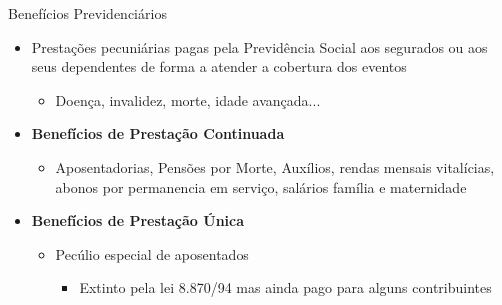 \begin{frame}
  \begin{block}{Benefícios Previdenciários}
    \begin{itemize}
      \item Prestações pecuniárias pagas pela Previdência Social aos segurados
      ou aos seus dependentes de forma a atender a cobertura dos
      \alert{eventos}
      \begin{itemize}
        \item Doença, invalidez, morte, idade avançada...
      \end{itemize}
      \item \textbf{Benefícios de Prestação Continuada}
      \begin{itemize}
        \item Aposentadorias, Pensões por Morte, Auxílios, rendas mensais
        vitalícias, abonos por permanencia em serviço, salários família e
        maternidade
      \end{itemize}
      \item \textbf{Benefícios de Prestação Única}
      \begin{itemize}
        \item Pecúlio especial de aposentados
        \begin{itemize}
          \item Extinto pela lei 8.870/94 mas ainda pago para alguns
          contribuintes
        \end{itemize}
      \end{itemize}
    \end{itemize}
  \end{block}
\end{frame}





